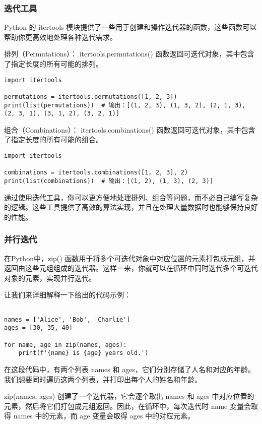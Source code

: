 \documentclass{article}
\begin{document}
\subsubsection{迭代工具}
Python 的 itertools 模块提供了一些用于创建和操作迭代器的函数，这些函数可以帮助你更高效地处理各种迭代需求。

排列（Permutations）：
itertools.permutations() 函数返回可迭代对象，其中包含了指定长度的所有可能的排列。
\begin{lstlisting}[caption={示例Python代码}]
import itertools

permutations = itertools.permutations([1, 2, 3])
print(list(permutations))  # 输出：[(1, 2, 3), (1, 3, 2), (2, 1, 3), (2, 3, 1), (3, 1, 2), (3, 2, 1)]
\end{lstlisting}
组合（Combinations）：
itertools.combinations() 函数返回可迭代对象，其中包含了指定长度的所有可能的组合。
\begin{lstlisting}[caption={示例Python代码}]
import itertools

combinations = itertools.combinations([1, 2, 3], 2)
print(list(combinations))  # 输出：[(1, 2), (1, 3), (2, 3)]
\end{lstlisting}
通过使用迭代工具，你可以更方便地处理排列、组合等问题，而不必自己编写复杂的逻辑。这些工具提供了高效的算法实现，并且在处理大量数据时也能够保持良好的性能。
\subsubsection{并行迭代}
在Python中，zip() 函数用于将多个可迭代对象中对应位置的元素打包成元组，并返回由这些元组组成的迭代器。这样一来，你就可以在循环中同时迭代多个可迭代对象的元素，实现并行迭代。

让我们来详细解释一下给出的代码示例：
\begin{lstlisting}[caption={示例Python代码}]

names = ['Alice', 'Bob', 'Charlie']
ages = [30, 35, 40]

for name, age in zip(names, ages):
    print(f'{name} is {age} years old.')
\end{lstlisting}
    

在这段代码中，有两个列表 names 和 ages，它们分别存储了人名和对应的年龄。我们想要同时遍历这两个列表，并打印出每个人的姓名和年龄。

zip(names, ages) 创建了一个迭代器，它会逐个取出 names 和 ages 中对应位置的元素，然后将它们打包成元组返回。因此，在循环中，每次迭代时 name 变量会取得 names 中的元素，而 age 变量会取得 ages 中的对应元素。
\end{document}
